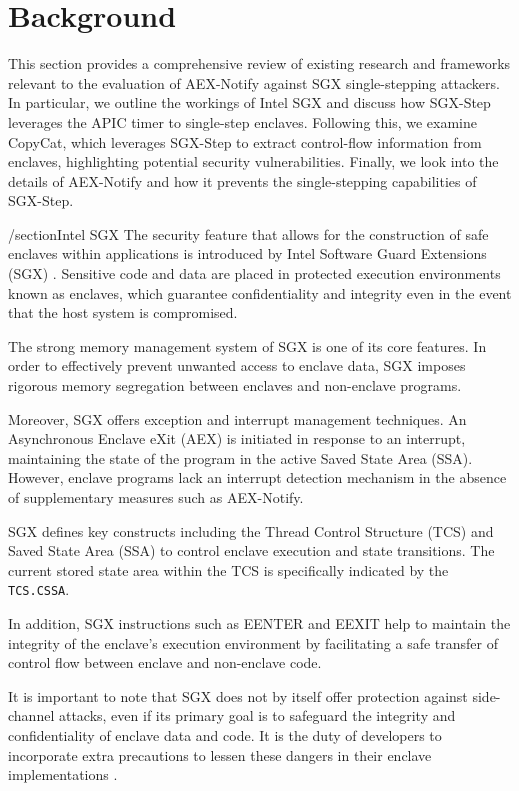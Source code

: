 \documentclass{llncs}
\begin{document}
\section{Background}

This section provides a comprehensive review of existing research and frameworks
relevant to the evaluation of AEX-Notify against SGX single-stepping attackers.
In particular, we outline the workings of Intel SGX and
discuss how SGX-Step leverages the APIC timer to single-step enclaves.
Following this, we examine CopyCat, which leverages SGX-Step to extract
control-flow information from enclaves, highlighting potential security
vulnerabilities.
Finally, we look into the details of AEX-Notify and
how it prevents the single-stepping capabilities of SGX-Step.

/section{Intel SGX}
The security feature that allows for the construction of safe enclaves within applications is introduced by Intel Software Guard Extensions (SGX) \cite{CostanD16}. Sensitive code and data are placed in protected execution environments known as enclaves, which guarantee confidentiality and integrity even in the event that the host system is compromised.

The strong memory management system of SGX is one of its core features. In order to effectively prevent unwanted access to enclave data, SGX imposes rigorous memory segregation between enclaves and non-enclave programs.

Moreover, SGX offers exception and interrupt management techniques. An Asynchronous Enclave eXit (AEX) is initiated in response to an interrupt, maintaining the state of the program in the active Saved State Area (SSA). However, enclave programs lack an interrupt detection mechanism in the absence of supplementary measures such as AEX-Notify.

SGX defines key constructs including the Thread Control Structure (TCS) and Saved State Area (SSA) to control enclave execution and state transitions. The current stored state area within the TCS is specifically indicated by the \texttt{TCS.CSSA}.

In addition, SGX instructions such as EENTER and EEXIT help to maintain the integrity of the enclave's execution environment by facilitating a safe transfer of control flow between enclave and non-enclave code.

It is important to note that SGX does not by itself offer protection against side-channel attacks, even if its primary goal is to safeguard the integrity and confidentiality of enclave data and code. It is the duty of developers to incorporate extra precautions to lessen these dangers in their enclave implementations \cite{CostanD16}.
\end{document}
